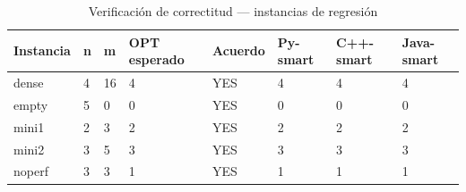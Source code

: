 \begin{table}[htbp]
\centering
\caption{Verificaci\'on de correctitud --- instancias de regresi\'on}
\label{tab:correctness}
\begin{tabular}{llllllll}
\toprule
Instancia & n & m & OPT esperado & Acuerdo & Py-smart & C++-smart & Java-smart \\
\midrule
dense & 4 & 16 & 4 & YES & 4 & 4 & 4 \\
empty & 5 & 0 & 0 & YES & 0 & 0 & 0 \\
mini1 & 2 & 3 & 2 & YES & 2 & 2 & 2 \\
mini2 & 3 & 5 & 3 & YES & 3 & 3 & 3 \\
noperf & 3 & 3 & 1 & YES & 1 & 1 & 1 \\
\bottomrule
\end{tabular}
\end{table}

